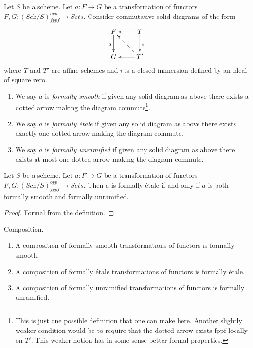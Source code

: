 \begin{definition}
\label{definition-formally-smooth-etale-unramified}
Let $S$ be a scheme.
Let $a : F \to G$ be a transformation of functors
$F, G : (\textit{Sch}/S)_{fppf}^{opp} \to \textit{Sets}$.
Consider commutative solid diagrams of the form
$$
\xymatrix{
F \ar[d]_a & T \ar[d]^i \ar[l] \\
G & T' \ar[l] \ar@{-->}[lu]
}
$$
where $T$ and $T'$ are affine schemes and $i$ is a closed immersion
defined by an ideal of square zero.
\begin{enumerate}
\item We say $a$ is {\it formally smooth} if given any solid
diagram as above there exists a dotted arrow making the diagram
commute\footnote{This is just one possible definition that one can
make here. Another slightly weaker condition would be to require that
the dotted arrow exists fppf locally on $T'$. This weaker notion
has in some sense better formal properties.}.
\item We say $a$ is {\it formally \'etale} if given any solid
diagram as above there exists exactly one dotted arrow making the diagram
commute.
\item We say $a$ is {\it formally unramified} if given any solid
diagram as above there exists at most one dotted arrow making the diagram
commute.
\end{enumerate}
\end{definition}

\begin{lemma}
\label{lemma-formally-etale-is-combination}
Let $S$ be a scheme.
Let $a : F \to G$ be a transformation of functors
$F, G : (\textit{Sch}/S)_{fppf}^{opp} \to \textit{Sets}$.
Then $a$ is formally \'etale if and only if $a$ is both formally
smooth and formally unramified.
\end{lemma}

\begin{proof}
Formal from the definition.
\end{proof}

\begin{lemma}
\label{lemma-composition-formally-smooth-etale-unramified}
Composition.
\begin{enumerate}
\item A composition of formally smooth transformations of functors is formally
smooth.
\item A composition of formally \'etale transformations of functors is formally
\'etale.
\item A composition of formally unramified transformations of functors is
formally unramified.
\end{enumerate}
\end{lemma}

